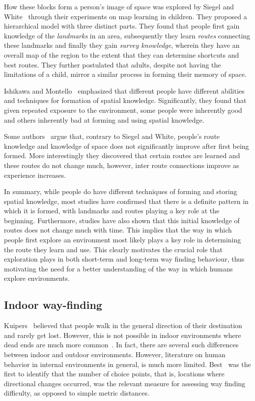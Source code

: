 How these blocks form a person's image of space was explored by Siegel and White~\cite{Siegel19759} through their experiments on map learning in children. They proposed a hierarchical model with three distinct parts. They found that people first gain knowledge of the \emph{landmarks} in an area, subsequently they learn \emph{routes} connecting these landmarks and finally they gain \emph{survey knowledge}, wherein they have an overall map of the region to the extent that they can determine shortcuts and best routes. They further postulated that adults, despite not having the limitations of a child, mirror a similar process in forming their memory of space.

 Ishikawa and Montello~\cite{Ishikawa200693} emphasized that different people have different abilities and techniques for formation of spatial knowledge. Significantly, they found that given repeated exposure to the environment, some people were inherently good and others inherently bad at forming and using spatial knowledge.

 Some authors~\cite{Moeser01011988,Ishikawa200693} argue that, contrary to Siegel and White, people's route knowledge and knowledge of space does not significantly improve after first being formed. More interestingly they discovered that certain routes are learned and these routes do not change much, however, inter route connections improve as experience increases.

 In summary, while people do have different techniques of forming and storing spatial knowledge, most studies have confirmed that there is a definite pattern in which it is formed, with landmarks and routes playing a key role at the beginning. Furthermore, studies have also shown that this initial knowledge of routes does not change much with time. This implies that the way in which people first explore an environment most likely plays a key role in determining the route they learn and use. This clearly motivates the crucial role that exploration plays in both short-term and long-term way finding behaviour, thus motivating the need for a better understanding of the way in which humans explore environments.

\subsection{Indoor way-finding} %
\label{sec:indoor_wayfinding}


Kuipers~\cite{Kuipers78} believed that people walk in the general direction of their destination and rarely get lost. However, this is not possible in indoor environments where dead ends are much more common~\cite{HolscherBMS06}. In fact, there are several such differences between indoor and outdoor environments. However, literature on human behavior in internal environments in general, is much more limited. Best~\cite{best1970direction} was the first to identify that the number of choice points, that is, locations where directional changes occurred, was the relevant measure for assessing way finding difficulty, as opposed to simple metric distances.


